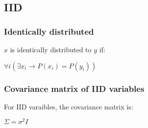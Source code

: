 
\subsection{IID}

\subsubsection{Identically distributed}

\(x\) is identically distributed to \(y\) if:

\(\forall i (\exists x_i \rightarrow P(x_i)=P(y_i))\)

\subsubsection{Covariance matrix of IID variables}

For IID varaibles, the covariance  matrix is:

\(\Sigma = \sigma^2 I\)

